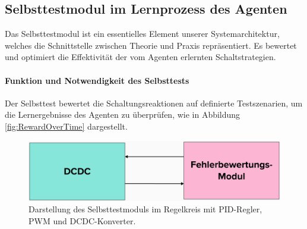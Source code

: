 \subsection{Selbsttestmodul im Lernprozess des Agenten}
\label{sec:Selbsttestmodul}

Das Selbsttestmodul ist ein essentielles Element unserer Systemarchitektur, welches die Schnittstelle zwischen Theorie und Praxis repräsentiert. Es bewertet und optimiert die Effektivität der vom Agenten erlernten Schaltstrategien.

\paragraph{Funktion und Notwendigkeit des Selbsttests}
Der Selbsttest bewertet die Schaltungsreaktionen auf definierte Testszenarien, um die Lernergebnisse des Agenten zu überprüfen, wie in Abbildung \ref{fig:RewardOverTime} dargestellt.
\begin{figure}[htbp]
    \centering
    \includegraphics[width=0.5\linewidth]{3Experiment/2Experiment/4reward.png}
    \caption{Darstellung des Selbsttestmoduls im Regelkreis mit PID-Regler, PWM und DCDC-Konverter.}
    \label{fig:ControlLoop}
\end{figure}

